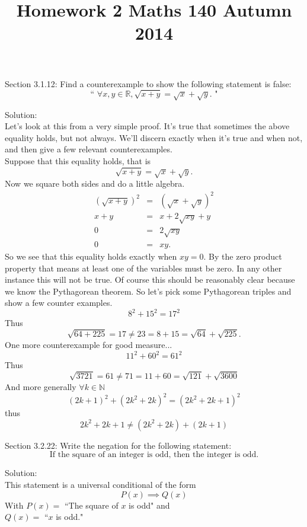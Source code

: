 \documentclass[10 pt]{amsart}
\theoremstyle{definition}
\theoremstyle{remark}
\numberwithin{equation}{subsection}
\begin{document}
\title{Homework 2 Maths 140 Autumn 2014}
\maketitle

Section 3.1.12: Find a counterexample to show the following statement is false:\\

\[
\text{`` }\forall x,y\in\mathbb{R}, \sqrt{x+y} =\sqrt{x}+\sqrt{y}\text{. "}
\]


Solution:\\
Let's look at this from a very simple proof.  It's true that sometimes the above equality holds, but not always.  We'll discern exactly when it's true and when not, and then give a few relevant counterexamples.\\

Suppose that this equality holds, that is
\[
\sqrt{x+y} = \sqrt{x} + \sqrt{y}.
\]
Now we square both sides and do a little algebra.
\begin{eqnarray*}
(\sqrt{x+y})^2 & = & (\sqrt{x} + \sqrt{y})^2\\
    x+y        & = &  x + 2\sqrt{xy} + y\\
    0 & = & 2\sqrt{xy}\\
    0 & = & xy.   
\end{eqnarray*}
So we see that this equality holds exactly when $xy=0$.  By the zero product property that means at least one of the variables must be zero.  In any other instance this will not be true.  Of course this should be reasonably clear because we know the Pythagorean theorem.  So let's pick some Pythagorean triples and show a few counter examples.\\

\[
8^2 + 15^2 = 17^2
\]
Thus
\[
\sqrt{64+ 225} = 17 \neq 23 = 8 + 15 = \sqrt{64}+\sqrt{225}.
\]
One more counterexample for good measure...
\[
11^2 + 60^2 = 61^2
\]
Thus
\[
\sqrt{3721} = 61 \neq 71 = 11 + 60 = \sqrt{121} + \sqrt{3600}
\]
And more generally $\forall k\in \mathbb{N}$
\[
(2k+1)^2 + (2k^2+2k)^2 = (2k^2+2k+1)^2
\]
thus
\[
2k^2 + 2k + 1 \neq (2k^2+2k)+(2k+1)
\]

\newpage

Section 3.2.22: Write the negation for the following statement:
\[
\text{If the square of an integer is odd, then the integer is odd.}
\]

Solution:\\
This statement is a universal conditional of the form
\[
P(x) \implies Q(x) 
\]
With $P(x) = $ ``The square of $x$ is odd" and\\
$Q(x) = $ ``$x$ is odd."\\
\end{document}
